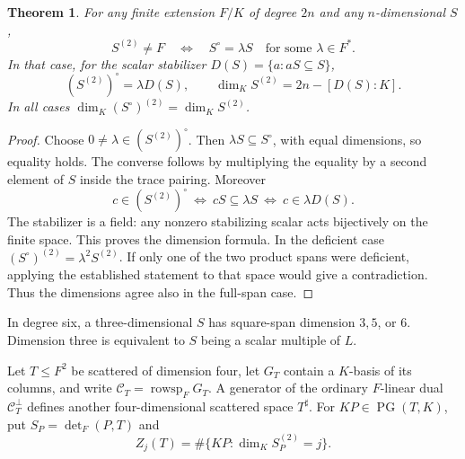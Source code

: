 \documentclass[12pt,letterpaper,onecolumn]{article}
\newtheorem{theorem}{Theorem}
\theoremstyle{definition}
\theoremstyle{remark}
\DeclareMathOperator{\PG}{PG}
\DeclareMathOperator{\rowsp}{rowsp}
\begin{document}
\begin{theorem}\label{thm:core-half}
For any finite extension \(F/K\) of degree \(2n\) and any \(n\)-dimensional \(S\),
\[
S^{(2)}\ne F\quad\Longleftrightarrow\quad S^\circ=\lambda S
\quad\text{for some }\lambda\in F^*.
\]
In that case, for the scalar stabilizer \(D(S)=\{a:aS\subseteq S\}\),
\[
(S^{(2)})^\circ=\lambda D(S),\qquad
\dim_K S^{(2)}=2n-[D(S):K].
\]
In all cases \(\dim_K(S^\circ)^{(2)}=\dim_KS^{(2)}\).
\end{theorem}
\begin{proof}
Choose \(0\ne\lambda\in(S^{(2)})^\circ\). Then \(\lambda S\subseteq S^\circ\), with equal dimensions, so equality holds. The converse follows by multiplying the equality by a second element of \(S\) inside the trace pairing. Moreover
\[
c\in(S^{(2)})^\circ
\ \Longleftrightarrow\ cS\subseteq\lambda S
\ \Longleftrightarrow\ c\in\lambda D(S).
\]
The stabilizer is a field: any nonzero stabilizing scalar acts bijectively on the finite space. This proves the dimension formula. In the deficient case
\((S^\circ)^{(2)}=\lambda^2S^{(2)}\). If only one of the two product spans were deficient, applying the established statement to that space would give a contradiction. Thus the dimensions agree also in the full-span case.
\end{proof}

In degree six, a three-dimensional \(S\) has square-span dimension \(3,5\), or \(6\). Dimension three is equivalent to \(S\) being a scalar multiple of \(L\).

Let \(T\le F^2\) be scattered of dimension four, let \(G_T\) contain a \(K\)-basis of its columns, and write \(\mathcal C_T=\rowsp_FG_T\).
A generator of the ordinary \(F\)-linear dual \(\mathcal C_T^\perp\) defines another four-dimensional scattered space \(T^\sharp\).
For \(KP\in\PG(T,K)\), put \(S_P=\det_F(P,T)\) and
\[
Z_j(T)=\#\{KP:\dim_KS_P^{(2)}=j\}.
\]
\end{document}
